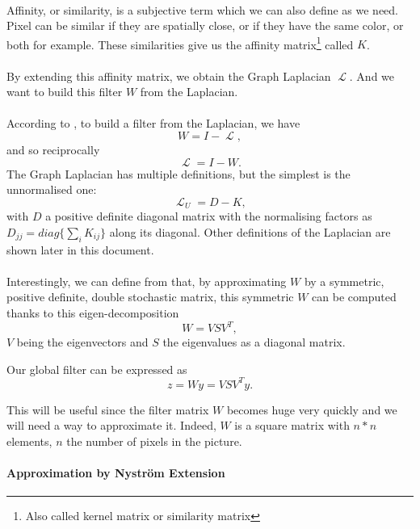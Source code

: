 \documentclass[]{article}
\DeclareMathOperator{\Lapl}{\mathcal{L}}
\begin{document}
\paragraph{}
Affinity, or similarity, is a subjective term which we can also define as we need.
Pixel can be similar if they are spatially close, or if they have the same color, or both for example.
These similarities give us the affinity matrix\footnote{Also called kernel matrix or similarity matrix} called \(K\).

\paragraph{}
By extending this affinity matrix, we obtain the Graph Laplacian \(\Lapl\).
And we want to build this filter \(W\) from the Laplacian.

\paragraph{}
According to \cite{modern_tour_2013}, to build a filter from the Laplacian, we have
\[W = I - \Lapl,\]
and so reciprocally
\[\Lapl = I - W.\]
The Graph Laplacian has multiple definitions, but the simplest is the unnormalised one:
\[\Lapl_U = D - K,\]
with \(D\) a positive definite diagonal matrix with the normalising factors as \(D_{jj} = diag\{\sum_i K_{ij}\}\) along its diagonal.
Other definitions of the Laplacian are shown later in this document. %

\paragraph{}
Interestingly, we can define from \cite{glide_2014} that, by approximating \(W\) by a symmetric, positive definite, double stochastic matrix, this symmetric \(W\) can be computed thanks to this eigen-decomposition
\[W = VSV^T,\]
\(V\) being the eigenvectors and \(S\) the eigenvalues as a diagonal matrix.

Our global filter can be expressed as
\[z = Wy = VSV^Ty.\]

This will be useful since the filter matrix \(W\) becomes huge very quickly and we will need a way to approximate it. Indeed, \(W\) is a square matrix with \(n*n\) elements, \(n\) the number of pixels in the picture.

\paragraph{Approximation by Nystr\"om Extension}
\end{document}

